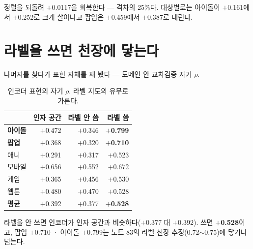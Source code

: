 \documentclass[10pt]{article}
\begin{document}
정렬을 되돌려 $+$0.0117을 회복한다 --- 격차의 25\%다. 대상별로는 아이돌이
$+$0.161에서 $+$0.252로 크게 살아나고 팝업은 $+$0.459에서 $+$0.387로 내린다.


\section{라벨을 쓰면 천장에 닿는다}

나머지를 찾다가 표현 자체를 재 봤다 --- 도메인 안 교차검증 자기 $\rho$.

\begin{table}[t]
\centering\tsize
\caption{인코더 표현의 자기 $\rho$. 라벨 지도의 유무로 가른다.}
\begin{tabular}{lrrr}
\toprule
& 인자 공간 & 라벨 안 씀 & \textbf{라벨 씀} \\
\midrule
\textbf{아이돌} & $+$0.472 & $+$0.346 & \textbf{$+$0.799} \\
\textbf{팝업} & $+$0.368 & $+$0.320 & \textbf{$+$0.710} \\
애니 & $+$0.291 & $+$0.317 & $+$0.523 \\
모바일 & $+$0.656 & $+$0.552 & $+$0.672 \\
게임 & $+$0.365 & $+$0.456 & $+$0.530 \\
웹툰 & $+$0.480 & $+$0.470 & $+$0.528 \\
\midrule
\textbf{평균} & $+$0.392 & $+$0.377 & \textbf{$+$0.528} \\
\bottomrule
\end{tabular}
\end{table}

라벨을 안 쓰면 인코더가 인자 공간과 비슷하다($+$0.377 대 $+$0.392). 쓰면
\textbf{$+$0.528}이고, 팝업 $+$0.710 · 아이돌 $+$0.799는 노트 83의 라벨 천장
추정(0.72$\sim$0.75)에 닿거나 넘는다.

\end{document}
